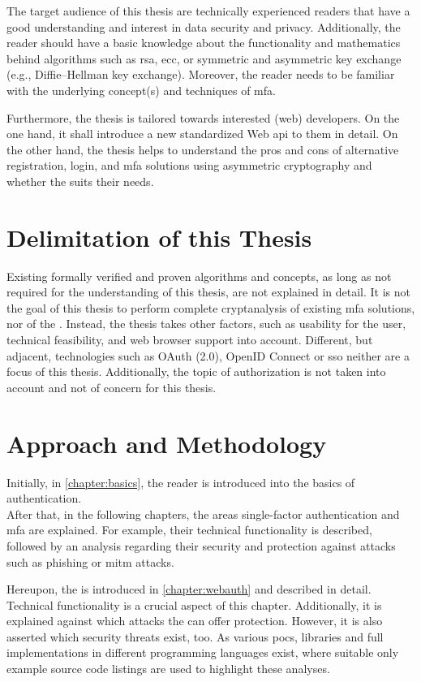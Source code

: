The target audience of this thesis are technically experienced readers that have a good understanding and interest in data security and privacy. Additionally, the reader should have a basic knowledge about the functionality and mathematics behind algorithms such as \gls{rsa}, \gls{ecc}, or symmetric and asymmetric key exchange (e.g., Diffie–Hellman key exchange). Moreover, the reader needs to be familiar with the underlying concept(s) and techniques of \gls{mfa}.

Furthermore, the thesis is tailored towards interested (web) developers. On the one hand, it shall introduce a new standardized Web \gls{api} to them in detail. On the other hand, the thesis helps to understand the pros and cons of alternative registration, login, and \gls{mfa} solutions using asymmetric cryptography and whether the \wa{} suits their needs.

\section{Delimitation of this Thesis}

Existing formally verified and proven algorithms and concepts, as long as not required for the understanding of this thesis, are not explained in detail. It is not the goal of this thesis to perform complete cryptanalysis of existing \gls{mfa} solutions, nor of the \wa. Instead, the thesis takes other factors, such as usability for the user, technical feasibility, and web browser support into account. Different, but adjacent, technologies such as OAuth (2.0), OpenID Connect or \gls{sso} neither are a focus of this thesis. Additionally, the topic of authorization is not taken into account and not of concern for this thesis. 

\section{Approach and Methodology}

Initially, in \autoref{chapter:basics}, the reader is introduced into the basics of authentication.\\
After that, in the following chapters, the areas single-factor authentication and \gls{mfa} are explained. For example, their technical functionality is described, followed by an analysis regarding their security and protection against attacks such as phishing or \gls{mitm} attacks.

Hereupon, the \wa{} is introduced in \autoref{chapter:webauth} and described in detail. Technical functionality is a crucial aspect of this chapter. Additionally, it is explained against which attacks the \wa{} can offer protection. However, it is also asserted which security threats exist, too. As various \glspl{poc}, libraries and full implementations in different programming languages exist, where suitable only example source code listings are used to highlight these analyses.


